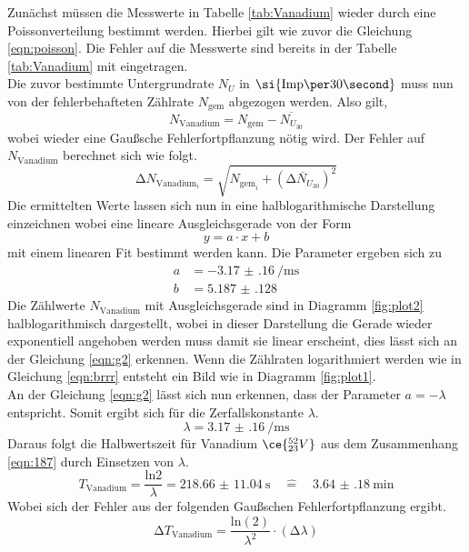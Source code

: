Zunächst müssen die Messwerte in Tabelle \ref{tab:Vanadium} wieder durch eine Poissonverteilung bestimmt werden.
Hierbei gilt wie zuvor die Gleichung \ref{eqn:poisson}. Die Fehler auf die Messwerte sind bereits in der 
Tabelle \ref{tab:Vanadium} mit eingetragen.
\\
\newline
Die zuvor bestimmte Untergrundrate $N_{U}$ in $\si{{\text{Imp\per}{30}}\second}$ muss nun von der fehlerbehafteten Zählrate
$N_{\text{gem}}$ abgezogen werden. Also gilt,
\begin{equation}
N_{\text{Vanadium}} = N_{\text{gem}} - \overline{N_{U_{30}}}
\end{equation}
wobei wieder eine Gaußsche Fehlerfortpflanzung nötig wird. Der Fehler auf $N_{\text{Vanadium}}$ berechnet sich wie folgt.
\begin{equation}
\increment N_{{\text{Vanadium}_{i}}} = \sqrt{N_{{\text{gem}_{i}}} + (\overline{\increment N_{U_{30}}})^{2} }
\end{equation}
Die ermittelten Werte lassen sich nun in eine halblogarithmische Darstellung einzeichnen wobei eine lineare Ausgleichsgerade
von der Form
\begin{equation}
\label{eqn:lin}
y = a \cdot x + b
\end{equation}
mit einem linearen Fit bestimmt werden kann. Die Parameter ergeben sich zu
\begin{align}
a &= \SI{-3.17(16)}{\per\milli\second} \\
b &= \SI{5.187(128)}{}
\end{align}
Die Zählwerte $N_{\text{Vanadium}}$ mit Ausgleichsgerade sind in Diagramm \ref{fig:plot2} halblogarithmisch dargestellt, wobei in dieser Darstellung die Gerade wieder exponentiell angehoben werden muss damit sie linear erscheint, dies lässt sich
an der Gleichung \eqref{eqn:g2} erkennen.
Wenn die Zählraten logarithmiert werden wie in Gleichung \eqref{eqn:brrr} entsteht ein Bild wie in Diagramm \ref{fig:plot1}.
\\
\newline
An der Gleichung \eqref{eqn:g2} lässt sich nun erkennen, dass der Parameter $a = -\lambda$ entspricht. Somit ergibt sich für die 
Zerfallskonstante $\lambda$.
\begin{equation}
\lambda = \SI{3.17(16)}{\per\milli\second} 
\end{equation}
Daraus folgt die Halbwertszeit für Vanadium $\ce{^{52}_{23}V}$ aus dem Zusammenhang \eqref{eqn:187} durch Einsetzen von $\lambda$.
\begin{equation}
T_{\text{Vanadium}} = \frac{\text{ln}2}{\lambda} = \SI{218.66(1104)}{\second} \quad  \widehat{=} \quad \SI{3.64(18)}{\minute}
\end{equation}
Wobei sich der Fehler aus der folgenden Gaußschen Fehlerfortpflanzung ergibt.
\begin{equation}
\increment T_{\text{Vanadium}} = \frac{\text{ln}(2)}{\lambda^{2}} \cdot (\increment \lambda)
\end{equation}


